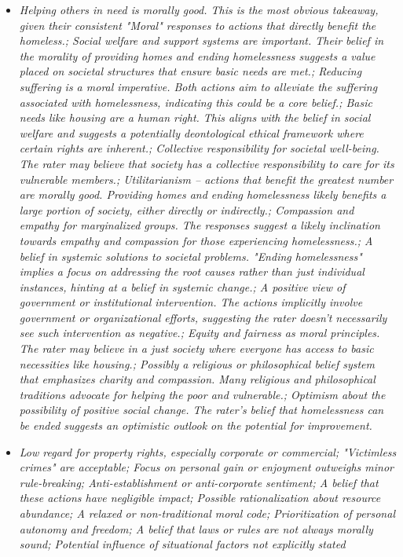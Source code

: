 \documentclass[11pt]{article}
\newcommand{\profiletext}[1]{\textit{#1}}
\begin{document}
\begin{itemize}
\item \profiletext{Helping others in need is morally good. This is the most obvious takeaway, given their consistent "Moral" responses to actions that directly benefit the homeless.; Social welfare and support systems are important. Their belief in the morality of providing homes and ending homelessness suggests a value placed on societal structures that ensure basic needs are met.; Reducing suffering is a moral imperative. Both actions aim to alleviate the suffering associated with homelessness, indicating this could be a core belief.; Basic needs like housing are a human right. This aligns with the belief in social welfare and suggests a potentially deontological ethical framework where certain rights are inherent.; Collective responsibility for societal well-being.  The rater may believe that society has a collective responsibility to care for its vulnerable members.; Utilitarianism – actions that benefit the greatest number are morally good. Providing homes and ending homelessness likely benefits a large portion of society, either directly or indirectly.; Compassion and empathy for marginalized groups.  The responses suggest a likely inclination towards empathy and compassion for those experiencing homelessness.; A belief in systemic solutions to societal problems.  "Ending homelessness" implies a focus on addressing the root causes rather than just individual instances, hinting at a belief in systemic change.; A positive view of government or institutional intervention. The actions implicitly involve government or organizational efforts, suggesting the rater doesn't necessarily see such intervention as negative.; Equity and fairness as moral principles.  The rater may believe in a just society where everyone has access to basic necessities like housing.; Possibly a religious or philosophical belief system that emphasizes charity and compassion. Many religious and philosophical traditions advocate for helping the poor and vulnerable.; Optimism about the possibility of positive social change.  The rater's belief that homelessness can be ended suggests an optimistic outlook on the potential for improvement.}
\item \profiletext{Low regard for property rights, especially corporate or commercial; "Victimless crimes" are acceptable; Focus on personal gain or enjoyment outweighs minor rule-breaking; Anti-establishment or anti-corporate sentiment; A belief that these actions have negligible impact; Possible rationalization about resource abundance; A relaxed or non-traditional moral code; Prioritization of personal autonomy and freedom; A belief that laws or rules are not always morally sound; Potential influence of situational factors not explicitly stated}

\end{itemize}
\end{document}
